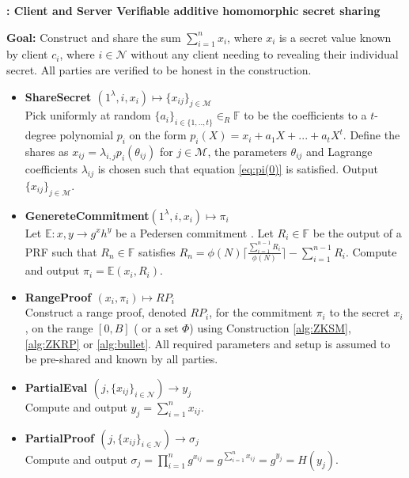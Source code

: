 \begin{algorithm}
\caption{\textbf{: Client and Server Verifiable additive homomorphic secret sharing}}

\textbf{Goal:} Construct and share the sum $\sum_{i=1}^n x_i$, where $x_i$ is a secret value known by client $c_i$, where $i\in\mathcal{N}$ without any client needing to revealing their individual secret. All parties are verified to be honest in the construction.
\vspace{2pt}
\hline
\vspace{2pt}
\begin{itemize}
 \item\textbf{ShareSecret $(1^\lambda,i,x_i) \mapsto \{x_{ij}\}_{j\in\mathcal{M}}$} \\
Pick uniformly at random $\{a_i\}_{i\in\{1,..,t\}}\in_R\mathds{F}$ to be the coefficients to a $t$-degree polynomial $p_i$ on the form $p_i(X) = x_i + a_1X+...+a_tX^t$. Define  the shares as $x_{ij}=\lambda_{i,j}p_i(\theta_{ij})$ for $j\in\mathcal{M}$, the parameters $\theta_{ij}$ and Lagrange coefficients $\lambda_{ij}$ is chosen such that equation \ref{eq:pi(0)} is satisfied.
Output $\{x_{ij}\}_{j\in\mathcal{M}}$.

\item\textbf{GenereteCommitment$(1^\lambda,i,x_i) \mapsto \pi_i$ }\\
Let $\mathds{E} : x,y \to g^xh^y$ be a Pedersen commitment . Let $R_i\in\mathds{F}$ be the output of a PRF such that $R_n\in \mathds{F}$  satisfies $R_n = \phi(N)\lceil \frac{\sum_{i=1}^{n-1}R_i}{\phi(N)}\rceil- \sum_{i=1}^{n-1}R_i $. Compute and output $\pi_i = \mathds{E}(x_i,R_i)$.

\item\textbf{RangeProof $(x_i,\pi_i) \mapsto RP_i$}\\
Construct a range proof, denoted $RP_i$, for the commitment $\pi_i$ to the secret $x_i$, on the  range $[0,B]$ ( or a set $\Phi$) using Construction \ref{alg:ZKSM}, \ref{alg:ZKRP} or \ref{alg:bullet}. All required  parameters and setup is assumed to be pre-shared and known by all parties.
\item\textbf{PartialEval $(j,\{x_{ij}\}_{i\in\mathcal{N}})\xrightarrow[]{}y_j$}\\
Compute and output $y_j = \sum_{i=1}^n x_{ij}$.

\item\textbf{PartialProof $(j,\{x_{ij}\}_{i\in\mathcal{N}})\xrightarrow[]{}\sigma_j$}\\
Compute and output $\sigma_j = \prod_{i=1}^n g^{x_{ij}} =  g^{\sum_{i=1}^n x_{ij}}= g^{y_j}=H(y_j)$.


\end{itemize}
\end{algorithm}
